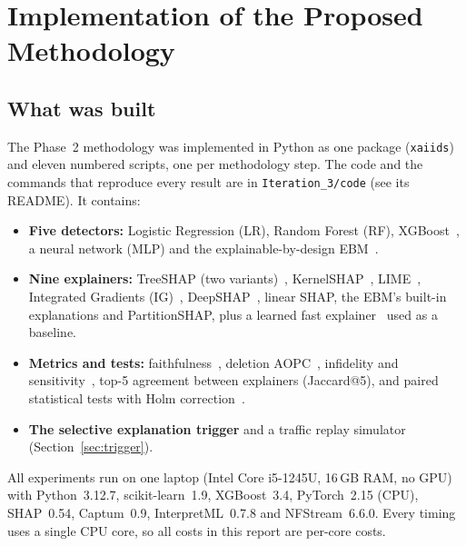 \section{Implementation of the Proposed Methodology}
\label{sec:impl}

\subsection{What was built}
The Phase~2 methodology was implemented in Python as one package (\texttt{xaiids}) and eleven numbered scripts, one per methodology step. The code and the commands that reproduce every result are in \texttt{Iteration\_3/code} (see its README). It contains:
\begin{itemize}[leftmargin=*, itemsep=0pt]
  \item \textbf{Five detectors:} Logistic Regression (LR), Random Forest (RF), XGBoost~\cite{chen2016}, a neural network (MLP) and the explainable-by-design EBM~\cite{nori2019}.
  \item \textbf{Nine explainers:} TreeSHAP (two variants)~\cite{lundberg2020}, KernelSHAP~\cite{lundberg2017}, LIME~\cite{ribeiro2016}, Integrated Gradients (IG)~\cite{sundararajan2017}, DeepSHAP~\cite{shrikumar2017}, linear SHAP, the EBM's built-in explanations and PartitionSHAP, plus a learned fast explainer~\cite{fastshap} used as a baseline.
  \item \textbf{Metrics and tests:} faithfulness~\cite{bhatt2020}, deletion AOPC~\cite{samek2017}, infidelity and sensitivity~\cite{yeh2019}, top-5 agreement between explainers (Jaccard@5), and paired statistical tests with Holm correction~\cite{demsar2006}.
  \item \textbf{The selective explanation trigger} and a traffic replay simulator (Section~\ref{sec:trigger}).
\end{itemize}
All experiments run on one laptop (Intel Core i5-1245U, 16\,GB RAM, no GPU) with Python~3.12.7, scikit-learn~1.9, XGBoost~3.4, PyTorch~2.15 (CPU), SHAP~0.54, Captum~0.9, InterpretML~0.7.8 and NFStream~6.6.0. Every timing uses a single CPU core, so all costs in this report are per-core costs.

